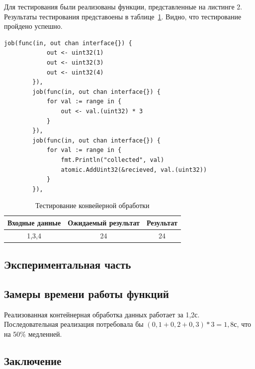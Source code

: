 \documentclass[a4paper,12pt]{article}
\begin{document}
		Для тестирования были реализованы функции, представленные на листинге 2. Результаты тестирования представоены в таблице~\ref{tabular:test_rec}. Видно, что тестирование пройдено успешно.
\begin{lstlisting}[frame=single,title=Листинг 2. Тестовые задачи, breaklines]
		job(func(in, out chan interface{}) {
			out <- uint32(1)
			out <- uint32(3)
			out <- uint32(4)
		}),
		job(func(in, out chan interface{}) {
			for val := range in {
				out <- val.(uint32) * 3
			}
		}),
		job(func(in, out chan interface{}) {
			for val := range in {
				fmt.Println("collected", val)
				atomic.AddUint32(&recieved, val.(uint32))
			}
		}),
\end{lstlisting}
        			\begin{table}[H]     
        			\captionsetup{labelsep=period}   		
       				\caption{\label{tabular:test_rec} Тестирование конвейерной обработки}
       				\begin{center}       			
        			\begin{tabular}{|c|c|c|}        				
        				\hline
						Входные данные & Ожидаемый результат & Результат \\ 
						\hline
        				1,3,4    & 24  & 24\\
        				\hline
        			\end{tabular}
       				\end{center}
        			\end{table}        			
        		
	\newpage

    \begin{center}
        \section{Экспериментальная часть}
	    \subsection{Замеры времени работы функций}	
	\end{center}
	    
	    Реализованная контейнерная обработка данных работает за 1,2с. Последовательная реализация потребовала бы $(0,1 + 0,2 + 0,3) * 3 = 1,8\text{с}$, что на 50\% медленней.
    \newpage

    \begin{center}
        \section*{Заключение}
    \end{center}
            \label{sec:ending}
            
\end{document}
